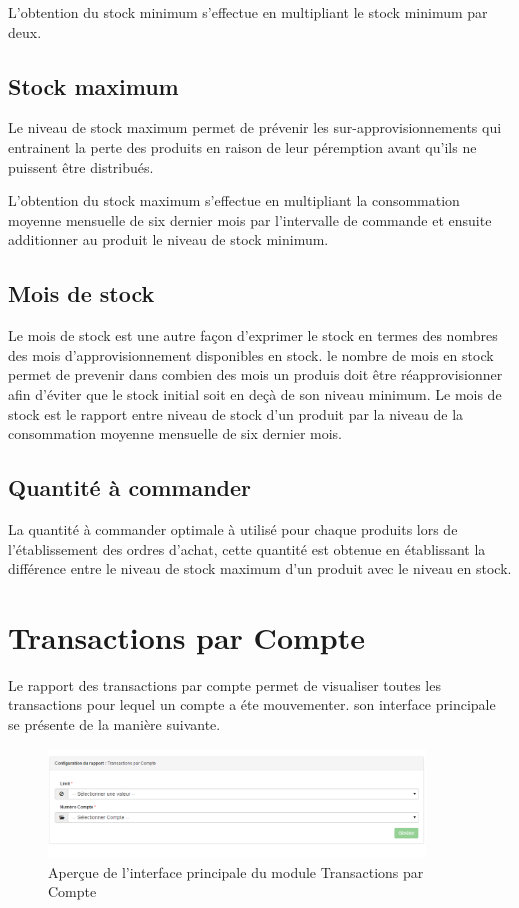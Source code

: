 \documentclass[12pt,a4paper]{report}
\begin{document}
L'obtention du stock minimum s'effectue en multipliant le stock minimum par deux.

\subsection{Stock maximum}
Le niveau de stock maximum permet de prévenir les sur-approvisionnements qui entrainent la perte des produits en raison de leur péremption avant qu'ils ne puissent être distribués.

L'obtention du stock maximum s'effectue en multipliant la consommation moyenne mensuelle de six dernier mois par l'intervalle de commande et ensuite additionner au produit le niveau de stock minimum.

\subsection{Mois de stock}
Le mois de stock est une autre façon d'exprimer le stock en termes des nombres des mois d'approvisionnement disponibles en stock. le nombre de mois en stock permet de prevenir dans combien des mois un produis doit être réapprovisionner afin d'éviter que le stock initial soit en deçà de son niveau minimum.
Le mois de stock est le rapport entre niveau de stock d'un produit par la niveau de la consommation moyenne mensuelle de six dernier mois. 

\subsection{Quantité à commander}
La quantité à commander optimale à utilisé pour chaque produits lors de l'établissement des ordres d'achat, cette quantité est obtenue en établissant la différence entre le niveau de stock maximum d'un produit avec le niveau en stock.



\newpage
\section{Transactions par Compte}
Le rapport des transactions par compte permet de visualiser toutes les transactions pour lequel un compte a éte mouvementer. son interface principale se présente de la manière suivante. 

\begin{figure}[h]
\begin{center}
\includegraphics[width=10cm]{pic/TransacCompte.png}
\end{center}
\caption{Aperçue de l'interface principale du module Transactions par Compte}
\label{Aperçue de l'interface principale du module Transactions par Compte}
\end{figure}
\end{document}
